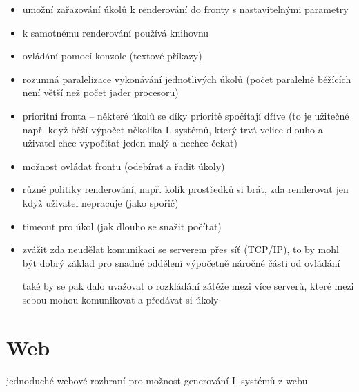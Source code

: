\documentclass[12pt, a4paper]{article}
\begin{document}
\begin{itemize}
	\item umožní zařazování úkolů k renderování do fronty s nastavitelnými parametry
	
	\item k samotnému renderování používá knihovnu
	
	\item ovládání pomocí konzole (textové příkazy)
	
	\item rozumná paralelizace vykonávání jednotlivých úkolů (počet paralelně běžících není větší než počet jader procesoru)
	
	\item prioritní fronta -- některé úkolů se díky prioritě spočítají dříve (to je užitečné např. když běží výpočet několika L-systémů, který trvá velice dlouho a uživatel chce vypočítat jeden malý a nechce čekat)
	
	\item možnost ovládat frontu (odebírat a řadit úkoly)
	
	\item různé politiky renderování, např. kolik prostředků si brát, zda renderovat jen když uživatel nepracuje (jako spořič)
	
	\item timeout pro úkol (jak dlouho se snažit počítat)
	
	\item zvážit zda neudělat komunikaci se serverem přes síť (TCP/IP), to by mohl být dobrý základ pro snadné oddělení výpočetně náročné části od ovládání

také by se pak dalo uvažovat o rozkládání zátěže mezi více serverů, které mezi sebou mohou komunikovat a předávat si úkoly
\end{itemize}


\section{Web}
jednoduché webové rozhraní pro možnost generování L-systémů z webu
\end{document}
